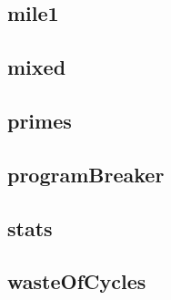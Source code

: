 \newpage
\subsection{mile1}
    \begin{figure}[h]
	    \centering
		
	\end{figure}


\newpage
\subsection{mixed}
    \begin{figure}[h]
	    \centering
		
	\end{figure}


\newpage
\subsection{primes}
    \begin{figure}[h]
	    \centering
		
	\end{figure}


\newpage
\subsection{programBreaker}
    \begin{figure}[h]
	    \centering
		
	\end{figure}


\newpage
\subsection{stats}
    \begin{figure}[h]
	    \centering
		
	\end{figure}


\newpage
\subsection{wasteOfCycles}
    \begin{figure}[h]
	    \centering
		
	\end{figure}

